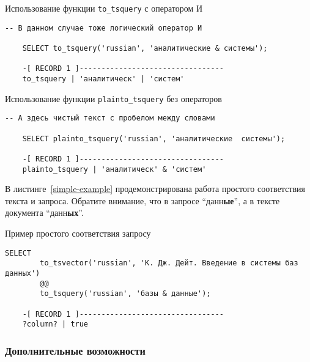 \begin{algorithm}
    \caption{Использование функции \texttt{to\_tsquery} с оператором И}
    \label{to-tsquery2-func}
    \begin{lstlisting}[style=codelistingstyle]
    -- В данном случае тоже логический оператор И

    SELECT to_tsquery('russian', 'аналитические & системы');

    -[ RECORD 1 ]---------------------------------
    to_tsquery | 'аналитическ' | 'систем'
    \end{lstlisting}
\end{algorithm}

\begin{algorithm}[H]
    \caption{Использование функции \texttt{plainto\_tsquery} без операторов}
    \label{plainto-tsquery-func}
    \begin{lstlisting}[style=codelistingstyle]
    -- А здесь чистый текст с пробелом между словами

    SELECT plainto_tsquery('russian', 'аналитические  системы');

    -[ RECORD 1 ]---------------------------------
    plainto_tsquery | 'аналитическ' & 'систем'
    \end{lstlisting}
\end{algorithm}

\noindent В листинге~\ref{simple-example} продемонстрирована работа простого соответствия текста и запроса.
Обратите внимание, что в запросе \enquote{данн\textbf{ые}}, а в тексте документа \enquote{данн\textbf{ых}}.

\begin{algorithm}
    \caption{Пример простого соответствия запросу}
    \label{simple-example}
    \begin{lstlisting}[style=codelistingstyle]
    SELECT
        to_tsvector('russian', 'К. Дж. Дейт. Введение в системы баз данных')
        @@
        to_tsquery('russian', 'базы & данные');

    -[ RECORD 1 ]---------------------------------
    ?column? | true
    \end{lstlisting}
\end{algorithm}

\subsubsection{Дополнительные возможности}

